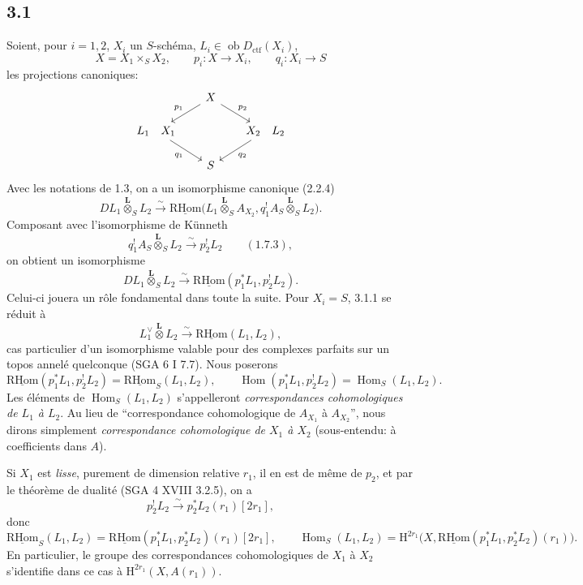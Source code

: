 \documentclass[11pt]{article}
\renewcommand{\H}{\mathrm{H}}
\DeclareMathOperator{\Hom}{Hom}
\newcommand{\R}{\mathrm{R}}\newcommand{\RHomCore}{\mathrm{RHom}}
\newcommand{\ob}{\operatorname{ob}}
\providecommand{\RHom}{\RHomCore}
\providecommand{\uRHom}{\underline{\RHom}}
\providecommand{\Dctf}{D_{\mathrm{ctf}}}
\providecommand{\Dctf}{D_{\mathrm{ctf}}}
\providecommand{\RHom}{\RHomCore}
\providecommand{\Hom}{\operatorname{Hom}}
\providecommand{\ob}{\operatorname{ob}}
\providecommand{\RHom}{\R\mathcal{H}om}
\providecommand{\R}{\mathrm R}
\providecommand{\RHom}{\RHomCore}
\providecommand{\Hom}{\operatorname{Hom}}
\begin{document}
\subsection*{3.1}
Soient, pour $i=1,2$, $X_i$ un $S$-schéma, $L_i\in\ob\Dctf(X_i)$,
\[
X=X_1\times_S X_2,
\qquad
p_i:X\longrightarrow X_i,
\qquad
q_i:X_i\longrightarrow S
\]
les projections canoniques:
\[
\begin{tikzcd}[column sep=1.8em,row sep=1.5em]
& X \arrow[dl,"p_1"'] \arrow[dr,"p_2"] & \\
L_1\quad X_1 \arrow[dr,"q_1"'] & & X_2\quad L_2 \arrow[dl,"q_2"] \\
& S &
\end{tikzcd}
\]
Avec les notations de 1.3, on a un isomorphisme canonique (2.2.4)
\[
DL_1\overset{\mathbf L}{\otimes}_S L_2
\xrightarrow{\sim}
\uRHom\bigl(L_1\overset{\mathbf L}{\otimes}_S A_{X_2},
q_1^!A_S\overset{\mathbf L}{\otimes}_S L_2\bigr).
\]
Composant avec l'isomorphisme de Künneth
\[
q_1^!A_S\overset{\mathbf L}{\otimes}_S L_2
\xrightarrow{\sim}p_2^!L_2 \qquad (1.7.3),
\]
on obtient un isomorphisme
\begin{equation}
DL_1\overset{\mathbf L}{\otimes}_S L_2
\xrightarrow{\sim}
\uRHom(p_1^*L_1,p_2^!L_2).
\tag{3.1.1}
\end{equation}
Celui-ci jouera un rôle fondamental dans toute la suite. Pour $X_i=S$, 3.1.1 se réduit à
\[
L_1^\vee\overset{\mathbf L}{\otimes}L_2\xrightarrow{\sim}\uRHom(L_1,L_2),
\]
cas particulier d'un isomorphisme valable pour des complexes parfaits sur un topos annelé quelconque (SGA 6 I 7.7). Nous poserons
\begin{equation}
\uRHom(p_1^*L_1,p_2^!L_2)=\uRHom_S(L_1,L_2),
\qquad
\Hom(p_1^*L_1,p_2^!L_2)=\Hom_S(L_1,L_2).
\tag{3.1.2}
\end{equation}
Les éléments de $\Hom_S(L_1,L_2)$ s'appelleront \emph{correspondances cohomologiques de $L_1$ à $L_2$}. Au lieu de ``correspondance cohomologique de $A_{X_1}$ à $A_{X_2}$'', nous dirons simplement \emph{correspondance cohomologique de $X_1$ à $X_2$} (sous-entendu: à coefficients dans $A$).

Si $X_1$ est \emph{lisse}, purement de dimension relative $r_1$, il en est de même de $p_2$, et par le théorème de dualité (SGA 4 XVIII 3.2.5), on a
\[
p_2^!L_2\xrightarrow{\sim}p_2^*L_2(r_1)[2r_1],
\]
donc
\begin{equation}
\uRHom_S(L_1,L_2)=\uRHom(p_1^*L_1,p_2^*L_2)(r_1)[2r_1],
\qquad
\Hom_S(L_1,L_2)=\H^{2r_1}\bigl(X,\uRHom(p_1^*L_1,p_2^*L_2)(r_1)\bigr).
\tag{3.1.3}
\end{equation}
En particulier, le groupe des correspondances cohomologiques de $X_1$ à $X_2$ s'identifie dans ce cas à $\H^{2r_1}(X,A(r_1))$.
\end{document}
